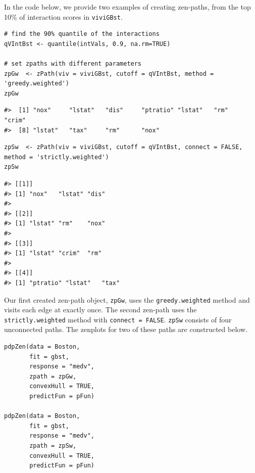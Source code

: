 In the code below, we provide two examples of creating zen-paths, from the top 10\% of interaction scores in \texttt{viviGBst}.

\begin{verbatim}
# find the 90% quantile of the interactions
qVIntBst <- quantile(intVals, 0.9, na.rm=TRUE)

# set zpaths with different parameters
zpGw  <- zPath(viv = viviGBst, cutoff = qVIntBst, method = 'greedy.weighted')
zpGw
\end{verbatim}

\begin{verbatim}
#>  [1] "nox"     "lstat"   "dis"     "ptratio" "lstat"   "rm"      "crim"   
#>  [8] "lstat"   "tax"     "rm"      "nox"
\end{verbatim}

\begin{verbatim}
zpSw  <- zPath(viv = viviGBst, cutoff = qVIntBst, connect = FALSE, method = 'strictly.weighted')
zpSw
\end{verbatim}

\begin{verbatim}
#> [[1]]
#> [1] "nox"   "lstat" "dis"  
#> 
#> [[2]]
#> [1] "lstat" "rm"    "nox"  
#> 
#> [[3]]
#> [1] "lstat" "crim"  "rm"   
#> 
#> [[4]]
#> [1] "ptratio" "lstat"   "tax"
\end{verbatim}

Our first created zen-path object, \texttt{zpGw}, uses the \texttt{greedy.weighted} method and visits each edge at exactly once. The second zen-path uses the \texttt{strictly.weighted} method with \texttt{connect\ =\ FALSE}.
\texttt{zpSw} consists of four unconnected paths.
The zenplots for two of these paths are constructed below.

\begin{verbatim}
pdpZen(data = Boston,
       fit = gbst,
       response = "medv",
       zpath = zpGw,
       convexHull = TRUE,
       predictFun = pFun) 

pdpZen(data = Boston,
       fit = gbst,
       response = "medv",
       zpath = zpSw,
       convexHull = TRUE,
       predictFun = pFun)
\end{verbatim}

